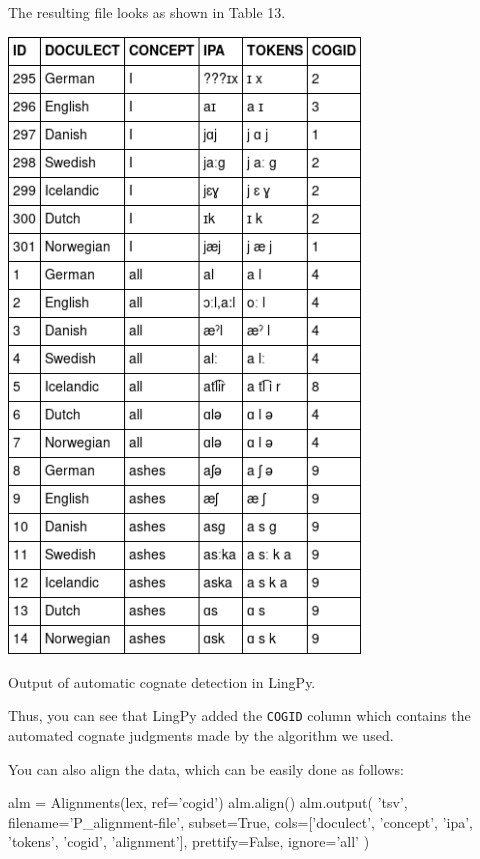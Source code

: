 \documentclass[a4paper,svgnames]{scrartcl}
\newenvironment{Shaded}{}{}
\newcommand{\StringTok}[1]{\textcolor[rgb]{0.25,0.44,0.63}{#1}}
\newcommand{\VariableTok}[1]{\textcolor[rgb]{0.10,0.09,0.49}{#1}}
\newcommand{\OperatorTok}[1]{\textcolor[rgb]{0.40,0.40,0.40}{#1}}
\newcommand{\NormalTok}[1]{#1}
\begin{document}
The resulting file looks as shown in Table 13.

\begin{table}
\centering
\includegraphics[width=0.7\textwidth]{images/table-13.png}
\caption{Output of automatic cognate detection in LingPy.}
\end{table}

Thus, you can see that LingPy added the \texttt{COGID} column which
contains the automated cognate judgments made by the algorithm we used.

You can also align the data, which can be easily done as follows:

\begin{Shaded}
\begin{Highlighting}[]
\NormalTok{alm }\OperatorTok{=}\NormalTok{ Alignments(lex, ref}\OperatorTok{=}\StringTok{'cogid'}\NormalTok{)}
\NormalTok{alm.align()}
\NormalTok{alm.output(}
    \StringTok{'tsv'}\NormalTok{, }
\NormalTok{    filename}\OperatorTok{=}\StringTok{'P_alignment-file'}\NormalTok{, }
\NormalTok{    subset}\OperatorTok{=}\VariableTok{True}\NormalTok{, }
\NormalTok{    cols}\OperatorTok{=}\NormalTok{[}\StringTok{'doculect'}\NormalTok{, }\StringTok{'concept'}\NormalTok{, }\StringTok{'ipa'}\NormalTok{, }\StringTok{'tokens'}\NormalTok{, }\StringTok{'cogid'}\NormalTok{, }\StringTok{'alignment'}\NormalTok{], }
\NormalTok{    prettify}\OperatorTok{=}\VariableTok{False}\NormalTok{, }
\NormalTok{    ignore}\OperatorTok{=}\StringTok{'all'}
\NormalTok{)}
\end{Highlighting}
\end{Shaded}
\end{document}
